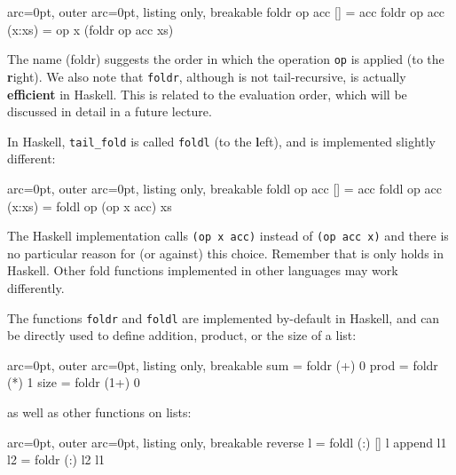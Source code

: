 \begin{tcblisting}{ arc=0pt, outer arc=0pt, listing only, breakable}
foldr op acc [] = acc
foldr op acc (x:xs) = op x (foldr op acc xs)

\end{tcblisting}


The name (foldr) suggests the order in which the operation \texttt{op} is applied (to the \textbf{r}ight). We also note that \texttt{foldr}, although is not tail-recursive, is actually \textbf{efficient} in Haskell. This is related to the evaluation order, which will be discussed in detail in a future lecture.

In Haskell, \texttt{tail\_fold} is called \texttt{foldl} (to the \textbf{l}eft), and is implemented slightly different:


\begin{tcblisting}{ arc=0pt, outer arc=0pt, listing only, breakable}
foldl op acc [] = acc
foldl op acc (x:xs) = foldl op (op x acc) xs

\end{tcblisting}


The Haskell implementation calls \texttt{(op x acc)} instead of \texttt{(op acc x)} and there is no particular reason for (or against) this choice. Remember that is only holds in Haskell. Other fold functions implemented in other languages may work differently.

The functions \texttt{foldr} and \texttt{foldl} are implemented by-default in Haskell, and can be directly used to define addition, product, or the size of a list:


\begin{tcblisting}{ arc=0pt, outer arc=0pt, listing only, breakable}
sum = foldr (+) 0
prod = foldr (*) 1
size = foldr (1+) 0

\end{tcblisting}


as well as other functions on lists:


\begin{tcblisting}{ arc=0pt, outer arc=0pt, listing only, breakable}
reverse l = foldl (:) [] l
append l1 l2 = foldr (:) l2 l1

\end{tcblisting}

